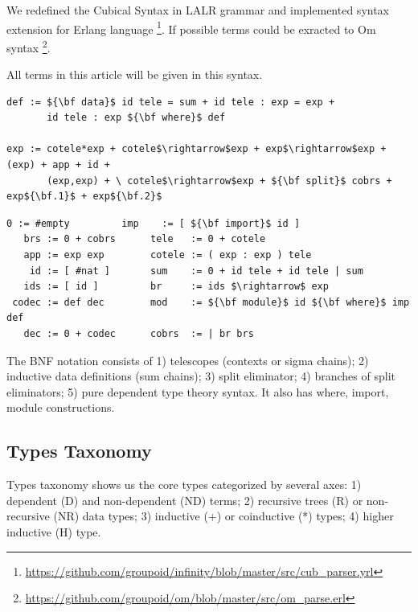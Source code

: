 \documentclass{article}
\begin{document}
We redefined the Cubical Syntax in LALR grammar and implemented
syntax extension for Erlang language \footnote{\url{https://github.com/groupoid/infinity/blob/master/src/cub_parser.yrl}}.
If possible terms could be exracted
to Om syntax \footnote{\url{https://github.com/groupoid/om/blob/master/src/om_parse.erl}}.

All terms in this article will be given in this syntax.

\begin{lstlisting}[mathescape=true]
def := ${\bf data}$ id tele = sum + id tele : exp = exp +
       id tele : exp ${\bf where}$ def

exp := cotele*exp + cotele$\rightarrow$exp + exp$\rightarrow$exp + (exp) + app + id +
       (exp,exp) + \ cotele$\rightarrow$exp + ${\bf split}$ cobrs + exp${\bf.1}$ + exp${\bf.2}$
\end{lstlisting}

\newpage
\begin{lstlisting}[mathescape=true]
     0 := #empty         imp    := [ ${\bf import}$ id ]
   brs := 0 + cobrs      tele   := 0 + cotele
   app := exp exp        cotele := ( exp : exp ) tele
    id := [ #nat ]       sum    := 0 + id tele + id tele | sum
   ids := [ id ]         br     := ids $\rightarrow$ exp
 codec := def dec        mod    := ${\bf module}$ id ${\bf where}$ imp def
   dec := 0 + codec      cobrs  := | br brs
\end{lstlisting}

The BNF notation consists of 1) telescopes (contexts or sigma chains);
2) inductive data definitions (sum chains); 3) split eliminator;
4) branches of split eliminators; 5) pure dependent type theory syntax.
It also has where, import, module constructions.

\subsection*{Types Taxonomy}

Types taxonomy shows us the core types categorized by several axes:
1) dependent (D) and non-dependent (ND) terms;
2) recursive trees (R) or non-recursive (NR) data types;
3) inductive (+) or coinductive (*) types;
4) higher inductive (H) type.
\end{document}
